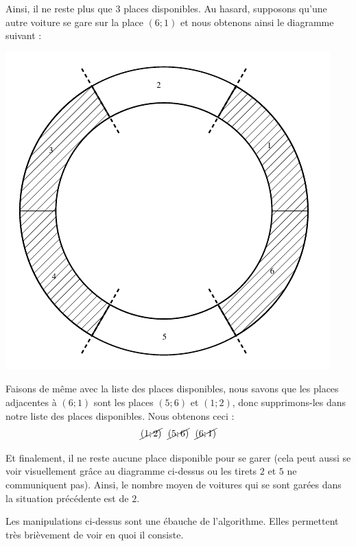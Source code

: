 \documentclass[a4paper,francais,11pt]{article}
\begin{document}
Ainsi, il ne reste plus que $3$ places disponibles. Au hasard, supposons qu'une autre voiture se gare sur la place $(6;1)$ et nous obtenons ainsi le diagramme suivant :
\begin{center}
\includegraphics{fig3.pdf}
\end{center}

Faisons de même avec la liste des places disponibles, nous savons que les places adjacentes à $(6;1)$ sont les places $(5;6)$ et $(1;2)$, donc supprimons-les dans notre liste des places disponibles. Nous obtenons ceci :
\[\cancel{(1;2)}\ \ \cancel{(5;6)}\ \ \cancel{(6;1)}\]

Et finalement, il ne reste aucune place disponible pour se garer (cela peut aussi se voir visuellement grâce au diagramme ci-dessus ou les tirets $2$ et $5$ ne communiquent pas). Ainsi, le nombre moyen de voitures qui se sont garées dans la situation précédente est de $2$.

Les manipulations ci-dessus sont une ébauche de l'algorithme. Elles permettent très brièvement de voir en quoi il consiste.
\end{document}
